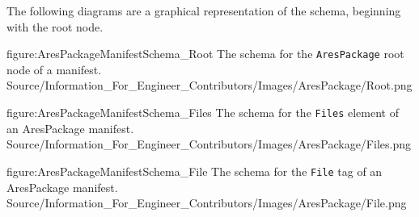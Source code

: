 The following diagrams are a graphical representation of the schema, beginning with the root node.

\FullPageLandscapeDiagram
    {figure:AresPackageManifestSchema_Root}
    {The schema for the {\tt AresPackage} root node of a manifest.}
    {Source/Information_For_Engineer_Contributors/Images/AresPackage/Root.png}

\FullPageLandscapeDiagram
    {figure:AresPackageManifestSchema_Files}
    {The schema for the {\tt Files} element of an AresPackage manifest.}
    {Source/Information_For_Engineer_Contributors/Images/AresPackage/Files.png}

\FullPageLandscapeDiagram
    {figure:AresPackageManifestSchema_File}
    {The schema for the {\tt File} tag of an AresPackage manifest.}
    {Source/Information_For_Engineer_Contributors/Images/AresPackage/File.png}

